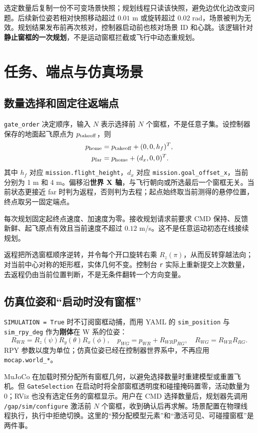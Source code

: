 \documentclass[UTF8,fontset=fandol,a4paper,10pt]{ctexart}
\newcommand{\code}[1]{{\small\nolinkurl{#1}}}
\begin{document}
选定数量后复制一份不可变场景快照；规划线程只读该快照，避免边优化边改变问题。后续新位姿若相对快照移动超过 $0.01$ m 或旋转超过 $0.02$ rad，场景被判为无效。规划结果发布前再次核对，控制器启动前也核对场景 ID 和心跳。该逻辑针对\textbf{静止窗框的一次规划}，不是运动窗框拦截或飞行中动态重规划。

\section{任务、端点与仿真场景}
\subsection{数量选择和固定往返端点}
\code{gate_order} 决定顺序，输入 $N$ 表示选择前 $N$ 个窗框，不是任意子集。设控制器保存的地面起飞原点为 $p_{\rm takeoff}$，则
\begin{align}
 p_{\rm home}&=p_{\rm takeoff}+(0,0,h_f)^T,\\
 p_{\rm far}&=p_{\rm home}+(d_x,0,0)^T.
\end{align}
其中 $h_f$ 对应 \code{mission.flight_height}，$d_x$ 对应 \code{mission.goal_offset_x}，当前分别为 1 m 和 4 m。偏移沿\textbf{世界 X 轴}，与飞行朝向或所选最后一个窗框无关。当前状态更接近 far 时判为返程，否则判为去程；起点始终取当前测得的悬停位置，终点取另一固定端点。

每次规划固定起终点速度、加速度为零。接收规划请求前要求 CMD 保持、反馈新鲜、起飞原点有效且当前速度不超过 $0.12$ m/s。这不是任意运动初态在线接续规划。

返程把所选窗框顺序逆转，并令每个开口旋转右乘 $R_z(\pi)$，从而反转穿越法向；对当前中心对称的矩形框，实体几何不变。控制台 \code{r} 实际上重新提交上次数量，去返程仍由当前位置判断，不是无条件翻转一个方向变量。

\subsection{仿真位姿和“启动时没有窗框”}
\code{SIMULATION = True} 时不订阅窗框动捕，而用 YAML 的 \code{sim_position} 与 \code{sim_rpy_deg} 作为\textbf{刚体}在 W 系的位姿：
\[
 R_{WR}=R_z(\psi)R_y(\theta)R_x(\phi),\quad
 p_{WG}=p_{WR}+R_{WR}p_{RG},\quad R_{WG}=R_{WR}R_{RG}.
\]
RPY 参数以度为单位；仿真位姿已经在控制器世界系中，不再应用 \code{mocap.world_*}。

MuJoCo 在加载时预分配所有窗框几何，以避免选择数量时重建模型或重置飞机。但 \code{GateSelection} 在启动时将全部窗框透明度和碰撞掩码置零，活动数量为 0；RViz 也没有选定任务的窗框显示。用户在 CMD 选择数量后，规划器先调用 \code{/gap/sim/configure} 激活前 $N$ 个窗框，收到确认后再求解。场景配置在物理线程执行，执行中拒绝切换。这里的“预分配模型元素”和“激活可见、可碰撞窗框”是两件事。
\end{document}
